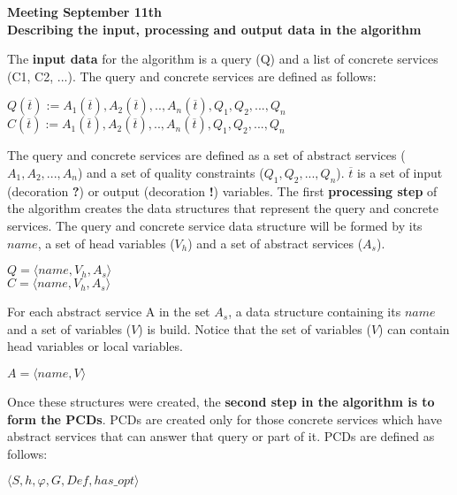 \documentclass[12pt,a4paper,oneside]{report}
\begin{document}
\begin{center}
\textbf{\large{Meeting September 11th}} \\
\textbf{Describing the input, processing and output data in the algorithm}
\end{center}

The \textbf{input data} for the algorithm is a query (Q) and a list of concrete services (C1, C2, ...). The query and concrete services are defined as follows:

\begin{center}
$Q (\overline{t}) := A_{1}(\overline{t}), A_{2}(\overline{t}), ..,  A_{n}(\overline{t}),Q_{1},Q_{2}, ..., Q_{n}$ \\
$C (\overline{t}) := A_{1}(\overline{t}), A_{2}(\overline{t}), ..,  A_{n}(\overline{t}),Q_{1},Q_{2}, ..., Q_{n}$
\end{center}

The query and concrete services are defined as a set of abstract services ($A_{1}, A_{2}, ..., A_{n}$) and a set of quality constraints ($Q_{1},Q_{2}, ..., Q_{n}$). $\overline{t}$ is a set of input (decoration \textbf{?}) or output (decoration \textbf{!}) variables. The first \textbf{processing step} of the algorithm creates the data structures that represent the query and concrete services. The query and concrete service data structure will be formed by its $name$, a set of head variables ($V_{h}$) and a set of abstract services ($A_{s}$).

\begin{center}
$Q = \langle name, V_{h}, A_{s} \rangle$ \\
$C = \langle name, V_{h}, A_{s} \rangle$
\end{center}

For each abstract service A in the set $A_{s}$, a data structure containing its $name$ and a set of variables ($V$) is build. Notice that the set of variables ($V$) can contain head variables or local variables.

\begin{center}
$A = \langle name, V\rangle$
\end{center}

Once these structures were created, the \textbf{second step in the algorithm is to form the PCDs}. PCDs are created only for those concrete services which have abstract services that can answer that query or part of it. PCDs are defined as follows:

\begin{center}
$\langle S, h, \varphi, G, Def, has\_opt\rangle$
\end{center}
\end{document}
